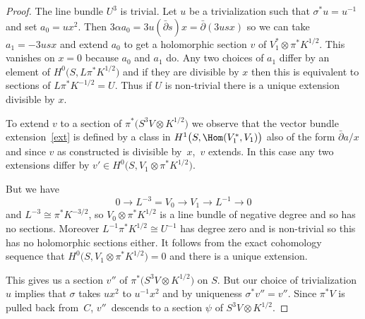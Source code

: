 \begin{proof}
The line bundle $U^3$ is trivial. Let $u$ be a trivialization such that $\sigma^*u=u^{-1}$ and set $a_0=ux^2$. Then
$3\alpha a_0=3u(\bar\partial s) x=\bar\partial (3usx)$
so we can take $a_1=-3usx$ and extend $a_0$ to get a holomorphic section $v$ of $V_1^*\otimes \pi^*K^{1/2}$. This vanishes on $x=0$ because $a_0$ and $a_1$ do. Any two choices of $a_1$ differ by an element of $H^0\big(S, L\pi^*K^{1/2}\big)$ and if they are divisible by $x$ then this is equivalent to sections of $L\pi^*K^{-1/2}=U$. Thus if $U$ is non-trivial there is a unique extension divisible by $x$.

To extend $v$ to a section of $\pi^*\big(S^3V\otimes K^{1/2}\big)$ we observe that the vector bundle extension~\eqref{ext} is defined by a class in $H^1\big(S, \Hom(V_1^*,V_1)\big)$ also of the form $\bar\partial a/x$ and since $v$ as constructed is divisible by~$x$,~$v$ extends. In this case any two extensions differ by $v'\in H^0\big(S,V_1\otimes \pi^*K^{1/2}\big)$.

But we have
 \begin{displaymath}0\rightarrow L^{-3}=V_{0}\rightarrow V_{1}\rightarrow L^{-1}\rightarrow 0\end{displaymath}
and $L^{-3}\cong \pi^*K^{-3/2}$, so $V_0\otimes \pi^*K^{1/2}$ is a line bundle of negative degree and so has no sections. Moreover $L^{-1}\pi^*K^{1/2} \cong U^{-1}$ has degree zero and is non-trivial so this has no holomorphic sections either. It follows from the exact cohomology sequence that $H^0\big(S, V_1\otimes \pi^*K^{1/2}\big)=0$ and there is a unique extension.

 This gives us a section $v''$ of $\pi^*\big(S^3V\otimes K^{1/2}\big)$ on $S$. But our choice of trivialization $u$ implies that $\sigma$ takes $ux^2$ to $u^{-1}x^2$ and by uniqueness $\sigma^*v''=v''$. Since $\pi^*V$ is pulled back from~$C$, $v''$~descends to a section $\psi$ of $S^3V\otimes K^{1/2}$.
\end{proof}
